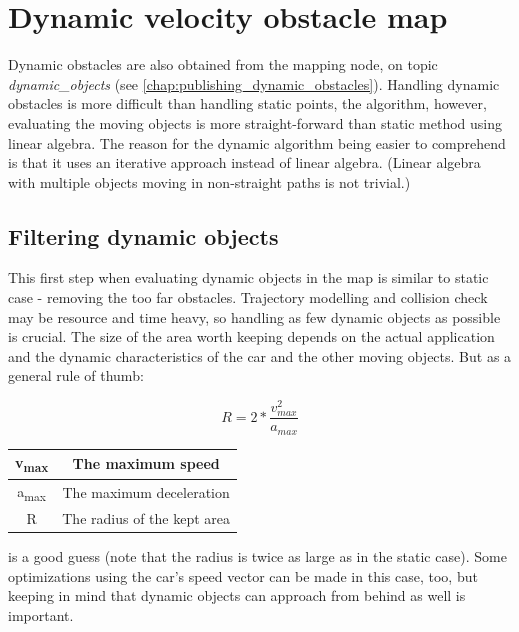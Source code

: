 \section{Dynamic velocity obstacle map}
\label{chap:dynamic_velocity_obstacle_map}
Dynamic obstacles are also obtained from the mapping node, on topic \textit{dynamic\_objects} (see \ref{chap:publishing_dynamic_obstacles}).
Handling dynamic obstacles is more difficult than handling static points, the algorithm, however, evaluating the moving objects is more straight-forward than static method using linear algebra. The reason for the dynamic algorithm being easier to comprehend is that it uses an iterative approach instead of linear algebra. (Linear algebra with multiple objects moving in non-straight paths is not trivial.)

\subsection{Filtering dynamic objects}
This first step when evaluating dynamic objects in the map is similar to static case - removing the too far obstacles. Trajectory modelling and collision check may be  resource and time heavy, so handling as few dynamic objects as possible is crucial. The size of the area worth keeping depends on the actual application and the dynamic characteristics of the car and the other moving objects. But as a general rule of thumb:

\[ R = 2 * \frac{v_{max}^2}{a_{max}} \]

\begin{center}
    \begin{tabular}{ | c | c | }
        \hline
        v\textsubscript{max}	& The maximum speed    			\\
        \hline
        a\textsubscript{max}  	& The maximum deceleration      \\
        \hline
        R  						& The radius of the kept area	\\
        \hline
    \end{tabular}
\end{center}

is a good guess (note that the radius is twice as large as in the static case). Some optimizations using the car's speed vector can be made in this case, too, but keeping in mind that dynamic objects can approach from behind as well is important.

